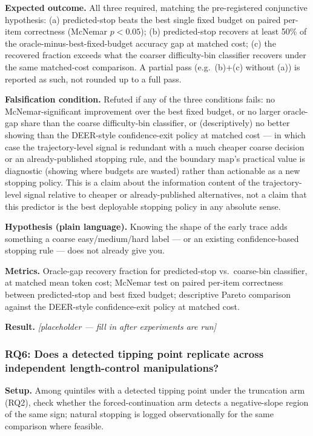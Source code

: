 \documentclass[11pt]{article}
\newcommand{\ph}{\textit{[placeholder --- fill in after experiments are run]}}
\begin{document}
\textbf{Expected outcome.} All three required, matching the pre-registered conjunctive hypothesis: (a) predicted-stop beats the best single fixed budget on paired per-item correctness (McNemar $p < 0.05$); (b) predicted-stop recovers at least 50\% of the oracle-minus-best-fixed-budget accuracy gap at matched cost; (c) the recovered fraction exceeds what the coarser difficulty-bin classifier recovers under the same matched-cost comparison. A partial pass (e.g.\ (b)+(c) without (a)) is reported as such, not rounded up to a full pass.

\textbf{Falsification condition.} Refuted if any of the three conditions fails: no McNemar-significant improvement over the best fixed budget, or no larger oracle-gap share than the coarse difficulty-bin classifier, or (descriptively) no better showing than the DEER-style confidence-exit policy at matched cost --- in which case the trajectory-level signal is redundant with a much cheaper coarse decision or an already-published stopping rule, and the boundary map's practical value is diagnostic (showing where budgets are wasted) rather than actionable as a new stopping policy. This is a claim about the information content of the trajectory-level signal relative to cheaper or already-published alternatives, not a claim that this predictor is the best deployable stopping policy in any absolute sense.

\textbf{Hypothesis (plain language).} Knowing the shape of the early trace adds something a coarse easy/medium/hard label --- or an existing confidence-based stopping rule --- does not already give you.

\textbf{Metrics.} Oracle-gap recovery fraction for predicted-stop vs.\ coarse-bin classifier, at matched mean token cost; McNemar test on paired per-item correctness between predicted-stop and best fixed budget; descriptive Pareto comparison against the DEER-style confidence-exit policy at matched cost.

\textbf{Result.} \ph

\subsubsection{RQ6: Does a detected tipping point replicate across independent length-control manipulations?}
\textbf{Setup.} Among quintiles with a detected tipping point under the truncation arm (RQ2), check whether the forced-continuation arm detects a negative-slope region of the same sign; natural stopping is logged observationally for the same comparison where feasible.
\end{document}

